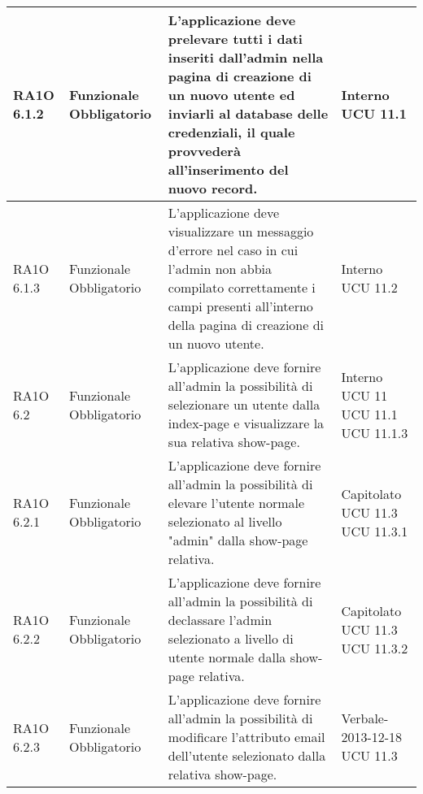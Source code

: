 \begin{center}
\begin{longtable}{ | l | p{2cm} | p{5cm} | p{1.7cm} |}
        RA1O 6.1.2 & Funzionale \newline  Obbligatorio  & L'applicazione deve prelevare tutti i dati inseriti dall'admin nella pagina di creazione di un nuovo utente ed inviarli al database delle credenziali, il quale provvederà  all'inserimento del nuovo record. &  Interno \newline  UCU 11.1 \newline  \\ \hline      
        RA1O 6.1.3 & Funzionale \newline  Obbligatorio  & L'applicazione deve visualizzare un messaggio d'errore nel caso in cui l'admin non abbia compilato correttamente i campi presenti all'interno della pagina di creazione di un nuovo utente. &  Interno \newline  UCU 11.2 \newline  \\ \hline      
        RA1O 6.2 & Funzionale \newline  Obbligatorio  & L'applicazione deve fornire all'admin la possibilità di selezionare un utente dalla index-page e visualizzare la sua relativa show-page. &  Interno \newline  UCU 11 \newline  UCU 11.1 \newline  UCU 11.1.3 \newline  \\ \hline      
        RA1O 6.2.1 & Funzionale \newline  Obbligatorio  & L'applicazione deve fornire all'admin la possibilità di elevare l'utente normale selezionato al livello "admin" dalla show-page relativa. &  Capitolato \newline  UCU 11.3 \newline  UCU 11.3.1 \newline  \\ \hline      
        RA1O 6.2.2 & Funzionale \newline  Obbligatorio  & L'applicazione deve fornire all'admin la possibilità di declassare l'admin selezionato a livello di utente normale dalla show-page relativa. &  Capitolato \newline  UCU 11.3 \newline  UCU 11.3.2 \newline  \\ \hline      
        RA1O 6.2.3 & Funzionale \newline  Obbligatorio  & L'applicazione deve fornire all'admin la possibilità di modificare l'attributo email dell'utente selezionato dalla relativa show-page. &  Verbale-2013-12-18 \newline  UCU 11.3 \newline  \\ \hline      

\end{longtable}
\end{center}
